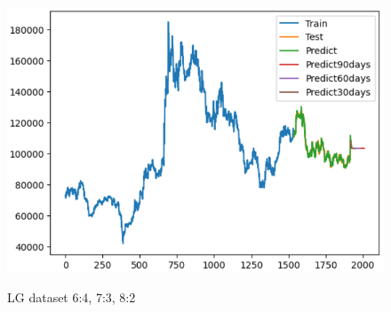 \documentclass[conference]{IEEEtran}
\begin{document}
\begin{figure}[H]
\begin{minipage}{0.15\textwidth}
    \label{fig:2}
    \end{minipage}%
    \begin{minipage}{0.15\textwidth}
    \centering
    \includegraphics[width=1\textwidth]{Image/XGBoost/XGBoost_LG_8_2.png}

    \label{fig:3}
    \end{minipage}
    \caption{ LG dataset 6:4, 7:3, 8:2 }
\end{figure}
\end{document}
